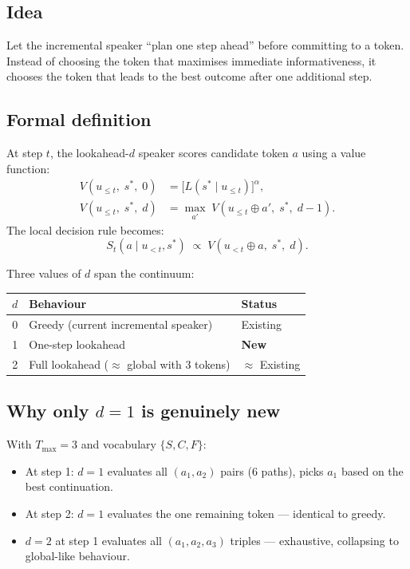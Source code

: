 \documentclass[11pt, a4paper]{article}
\begin{document}
\subsection{Idea}

Let the incremental speaker ``plan one step ahead'' before committing to a token.
Instead of choosing the token that maximises immediate informativeness, it chooses the token that leads to the best outcome after one additional step.

\subsection{Formal definition}

At step $t$, the lookahead-$d$ speaker scores candidate token $a$ using a value function:
\begin{align}
  V(u_{\leq t},\; s^*,\; 0) &= \bigl[L(s^* \mid u_{\leq t})\bigr]^\alpha, \\
  V(u_{\leq t},\; s^*,\; d) &= \max_{a'}\; V(u_{\leq t} \oplus a',\; s^*,\; d-1).
\end{align}
The local decision rule becomes:
\[
S_t(a \mid u_{<t}, s^*) \;\propto\; V(u_{<t} \oplus a,\; s^*,\; d).
\]

Three values of $d$ span the continuum:
\begin{center}
\begin{tabular}{cll}
\toprule
$d$ & Behaviour & Status \\
\midrule
0 & Greedy (current incremental speaker) & Existing \\
1 & One-step lookahead & \textbf{New} \\
2 & Full lookahead ($\approx$ global with 3 tokens) & $\approx$ Existing \\
\bottomrule
\end{tabular}
\end{center}

\subsection{Why only $d = 1$ is genuinely new}

With $T_\mathrm{max} = 3$ and vocabulary $\{S, C, F\}$:
\begin{itemize}
  \item At step 1: $d=1$ evaluates all $(a_1, a_2)$ pairs (6 paths), picks $a_1$ based on the best continuation.
  \item At step 2: $d=1$ evaluates the one remaining token --- identical to greedy.
  \item $d=2$ at step 1 evaluates all $(a_1, a_2, a_3)$ triples --- exhaustive, collapsing to global-like behaviour.
\end{itemize}
\end{document}
